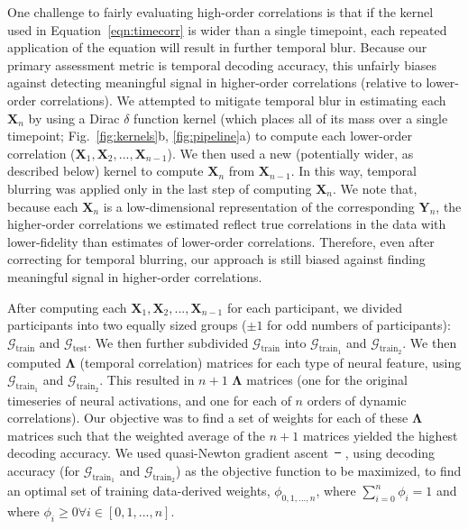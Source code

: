 \documentclass[english]{article}
\providecommand{\DIFaddtex}[1]{{\protect\color{blue}\uwave{#1}}} %
\providecommand{\DIFdeltex}[1]{{\protect\color{red}\sout{#1}}}                      %
\providecommand{\DIFaddbegin}{} %
\providecommand{\DIFaddend}{} %
\providecommand{\DIFdelbegin}{} %
\providecommand{\DIFdelend}{} %
\providecommand{\DIFadd}[1]{\texorpdfstring{\DIFaddtex{#1}}{#1}} %
\providecommand{\DIFdel}[1]{\texorpdfstring{\DIFdeltex{#1}}{}} %
\newcommand{\DIFscaledelfig}{0.5}
\newlength{\DIFdelgraphicswidth} %
\newlength{\DIFdelgraphicsheight} %
\newcommand{\DIFaddincludegraphics}[2][]{{\color{blue}\fbox{\DIFOincludegraphics[#1]{#2}}}} %
\newcommand{\DIFdelincludegraphics}[2][]{%
\sbox{\DIFdelgraphicsbox}{\DIFOincludegraphics[#1]{#2}}%
\settoboxwidth{\DIFdelgraphicswidth}{\DIFdelgraphicsbox} %
\settoboxtotalheight{\DIFdelgraphicsheight}{\DIFdelgraphicsbox} %
\scalebox{\DIFscaledelfig}{%
\parbox[b]{\DIFdelgraphicswidth}{\usebox{\DIFdelgraphicsbox}\\[-\baselineskip] \rule{\DIFdelgraphicswidth}{0em}}\llap{\resizebox{\DIFdelgraphicswidth}{\DIFdelgraphicsheight}{%
\setlength{\unitlength}{\DIFdelgraphicswidth}%
\begin{picture}(1,1)%
\thicklines\linethickness{2pt} %
{\color[rgb]{1,0,0}\put(0,0){\framebox(1,1){}}}%
{\color[rgb]{1,0,0}\put(0,0){\line( 1,1){1}}}%
{\color[rgb]{1,0,0}\put(0,1){\line(1,-1){1}}}%
\end{picture}%
}\hspace*{3pt}}} %
} %
\DeclareRobustCommand{\DIFaddbegin}{\DIFOaddbegin \let\includegraphics\DIFaddincludegraphics} %
\DeclareRobustCommand{\DIFaddend}{\DIFOaddend \let\includegraphics\DIFOincludegraphics} %
\DeclareRobustCommand{\DIFdelbegin}{\DIFOdelbegin \let\includegraphics\DIFdelincludegraphics} %
\DeclareRobustCommand{\DIFdelend}{\DIFOaddend \let\includegraphics\DIFOincludegraphics} %
\begin{document}
One challenge to fairly evaluating high-order correlations is that if
the kernel used in Equation~\ref{eqn:timecorr} is wider than a single
timepoint, each repeated application of the equation will result in
further temporal blur.  Because our primary assessment metric is
temporal decoding accuracy, this unfairly biases against detecting
meaningful signal in higher-order correlations (relative to
lower-order correlations).  We attempted to mitigate temporal blur in
estimating each $\mathbf{X}_n$ by using a Dirac $\delta$ function
kernel (which places all of its mass over a single timepoint;
Fig.~\ref{fig:kernels}b, \ref{fig:pipeline}a) to compute each lower-order correlation
($\mathbf{X}_1, \mathbf{X}_2, ..., \mathbf{X}_{n-1}$).  We then used a
new (potentially wider, as described below) kernel to compute
$\mathbf{X}_{n}$ from $\mathbf{X}_{n-1}$.  In this way, temporal
blurring was applied only in the last step of computing
$\mathbf{X}_n$.  We note that, because each $\mathbf{X}_n$ is a
low-dimensional representation of the corresponding $\mathbf{Y}_n$,
the higher-order correlations we estimated reflect true correlations
in the data with lower-fidelity than estimates of lower-order
correlations.  Therefore, even after correcting for temporal blurring,
our approach is still biased against finding meaningful signal in
higher-order correlations.

After computing each
$\mathbf{X}_1, \mathbf{X}_2, ..., \mathbf{X}_{n-1}$ for each
participant, we divided participants into two equally sized groups
($\pm 1$ for odd numbers of participants):
$\mathcal{G}_{\mathrm{train}}$ and $\mathcal{G}_{\mathrm{test}}$.  We
then further subdivided $\mathcal{G}_{\mathrm{train}}$ into
$\mathcal{G}_{\mathrm{train}_1}$ and $\mathcal{G}_{\mathrm{train}_2}$.
We then computed $\mathbf{\Lambda}$ (temporal correlation) matrices
for each type of neural feature, using
$\mathcal{G}_{\mathrm{train}_1}$ and $\mathcal{G}_{\mathrm{train}_2}$.
This resulted in $n+1$ $\mathbf{\Lambda}$ matrices (one for the
original timeseries of neural activations, and one for each of $n$
orders of dynamic correlations).  Our objective was to find a set of
weights for each of these $\mathbf{\Lambda}$ matrices such that the
weighted average of the $n+1$ matrices yielded the highest decoding
accuracy.  We used quasi-Newton gradient ascent~\DIFdelbegin \DIFdel{\mbox{%
\citep{NoceWrig06}}\hspace{0pt}%
}\DIFdelend \DIFaddbegin \DIFadd{\mbox{%
\cite{NoceWrig06}}\hspace{0pt}%
}\DIFaddend ,
using decoding accuracy (for $\mathcal{G}_{\mathrm{train}_1}$ and
$\mathcal{G}_{\mathrm{train}_2}$) as the objective function to be
maximized, to find an optimal set of training data-derived weights,
$\phi_{0, 1, ..., n}$, where $\sum_{i=0}^n \phi_i = 1$ and where
$\phi_i \geq 0 \forall i \in \left[0, 1, ..., n\right]$.
\end{document}
